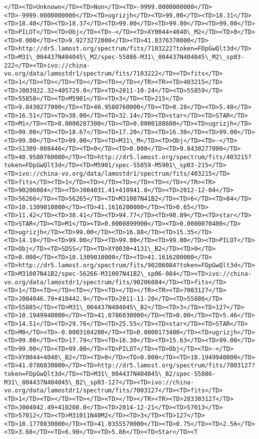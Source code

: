 \documentclass[11pt]{article}
\begin{document}
\begin{Verbatim}[commandchars=\\\{\}]
</TD><TD>Unknown</TD><TD>Non</TD><TD>-9999.0000000000</TD><TD>-9999.0000000000</TD><TD>ugrizjh</TD><TD>99.00</TD><TD>18.31</TD><TD>18.40</TD><TD>18.37</TD><TD>99.00</TD><TD>99.00</TD><TD>99.00</TD><TD>PILOT</TD><TD>Obj</TD><TD>-</TD><TD>XY0044+4040\_M2</TD><TD>0</TD><TD>0.000</TD><TD>9.9273272000</TD><TD>41.0376370000</TD><TD>http://dr5.lamost.org/spectrum/fits/7103222?token=FDpGwQlt3d</TD><TD>M31\_004437N404045\_M2/spec-55886-M31\_004437N404045\_M2\_sp03-222</TD><TD>ivo://china-vo.org/data/lamostdr1/spectrum/fits/7103222</TD><TD>fits</TD><TD>1</TD><TD></TD><TD></TD><TD></TD></TR><TR><TD>403215</TD><TD>J003922.32+405729.0</TD><TD>2011-10-24</TD><TD>55859</TD><TD>55858</TD><TD>M5901</TD><TD>3</TD><TD>215</TD><TD>9.8430277000</TD><TD>40.9580760000</TD><TD>0.28</TD><TD>5.48</TD><TD>16.51</TD><TD>38.00</TD><TD>32.14</TD><TD>star</TD><TD>STAR</TD><TD>M1</TD><TD>0.0000287300</TD><TD>0.0000188600</TD><TD>ugrizjh</TD><TD>99.00</TD><TD>18.67</TD><TD>17.20</TD><TD>16.30</TD><TD>99.00</TD><TD>99.00</TD><TD>99.00</TD><TD>M31\_M</TD><TD>Obj</TD><TD>-</TD><TD>S1309-008446</TD><TD>0</TD><TD>0.000</TD><TD>9.8430277000</TD><TD>40.9580760000</TD><TD>http://dr5.lamost.org/spectrum/fits/403215?token=FDpGwQlt3d</TD><TD>M5901/spec-55859-M5901\_sp03-215</TD><TD>ivo://china-vo.org/data/lamostdr1/spectrum/fits/403215</TD><TD>fits</TD><TD>1</TD><TD></TD><TD></TD><TD></TD></TR><TR><TD>90206084</TD><TD>J004031.41+410941.8</TD><TD>2012-12-04</TD><TD>56266</TD><TD>56265</TD><TD>M31007N41B2</TD><TD>6</TD><TD>84</TD><TD>10.1309010000</TD><TD>41.1616200000</TD><TD>0.65</TD><TD>11.42</TD><TD>38.41</TD><TD>94.77</TD><TD>90.89</TD><TD>star</TD><TD>STAR</TD><TD>M1</TD><TD>0.0000899900</TD><TD>0.0000070400</TD><TD>ugrizjh</TD><TD>99.00</TD><TD>16.88</TD><TD>15.35</TD><TD>14.18</TD><TD>99.00</TD><TD>99.00</TD><TD>99.00</TD><TD>PILOT</TD><TD>Obj</TD><TD>SDSS</TD><TD>XY0030+4131\_B2</TD><TD>0</TD><TD>0.000</TD><TD>10.1309010000</TD><TD>41.1616200000</TD><TD>http://dr5.lamost.org/spectrum/fits/90206084?token=FDpGwQlt3d</TD><TD>M31007N41B2/spec-56266-M31007N41B2\_sp06-084</TD><TD>ivo://china-vo.org/data/lamostdr1/spectrum/fits/90206084</TD><TD>fits</TD><TD>1</TD><TD></TD><TD></TD><TD></TD></TR><TR><TD>7003127</TD><TD>J004046.79+410442.9</TD><TD>2011-11-20</TD><TD>55886</TD><TD>55885</TD><TD>M31\_004437N404045\_B2</TD><TD>3</TD><TD>127</TD><TD>10.1949940000</TD><TD>41.0786030000</TD><TD>0.00</TD><TD>5.46</TD><TD>14.51</TD><TD>29.76</TD><TD>25.55</TD><TD>star</TD><TD>STAR</TD><TD>M0</TD><TD>-0.0003104200</TD><TD>0.0000173400</TD><TD>ugrizjh</TD><TD>99.00</TD><TD>17.79</TD><TD>16.30</TD><TD>15.63</TD><TD>99.00</TD><TD>99.00</TD><TD>99.00</TD><TD>PILOT</TD><TD>Obj</TD><TD>-</TD><TD>XY0044+4040\_B2</TD><TD>0</TD><TD>0.000</TD><TD>10.1949940000</TD><TD>41.0786030000</TD><TD>http://dr5.lamost.org/spectrum/fits/7003127?token=FDpGwQlt3d</TD><TD>M31\_004437N404045\_B2/spec-55886-M31\_004437N404045\_B2\_sp03-127</TD><TD>ivo://china-vo.org/data/lamostdr1/spectrum/fits/7003127</TD><TD>fits</TD><TD>1</TD><TD></TD><TD></TD><TD></TD></TR><TR><TD>283303127</TD><TD>J004042.49+410208.0</TD><TD>2014-12-21</TD><TD>57013</TD><TD>57012</TD><TD>M31011N40M2</TD><TD>3</TD><TD>127</TD><TD>10.1770830000</TD><TD>41.0355570000</TD><TD>0.75</TD><TD>2.56</TD><TD>3.68</TD><TD>6.90</TD><TD>5.86</TD><TD>Star</TD><T
\end{Verbatim}
\end{document}
